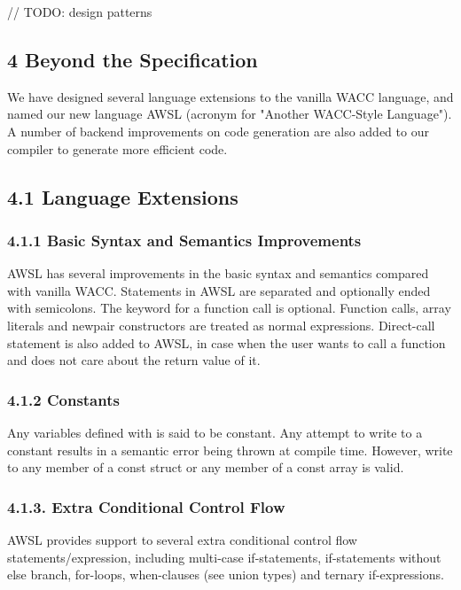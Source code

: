 \documentclass[10pt,a4paper]{report}
\begin{document}
  // TODO: design patterns

  \subsection*{4 Beyond the Specification}
  We have designed several language extensions to the vanilla WACC language, and named our new language AWSL (acronym for "Another WACC-Style Language").
  A number of backend improvements on code generation are also added to our compiler to generate more efficient code.
  \subsection*{4.1 Language Extensions}

  \subsubsection*{4.1.1 Basic Syntax and Semantics Improvements}
  AWSL has several improvements in the basic syntax and semantics compared with vanilla WACC. Statements in AWSL are separated and optionally
  ended with semicolons. The  keyword for a function call is optional. Function calls, array literals and newpair constructors 
  are treated as normal expressions. Direct-call statement is also added to AWSL, in case when the user wants to call a function and does not
  care about the return value of it.

  \subsubsection*{4.1.2 Constants}
  Any variables defined with  is said to be constant. Any attempt to write to a constant results in a semantic error being thrown at compile time.
  However, write to any member of a const struct or any member of a const array is valid. 

  \subsubsection*{4.1.3. Extra Conditional Control Flow}
  AWSL provides support to several extra conditional control flow statements/expression, including multi-case if-statements, if-statements
  without else branch, for-loops, when-clauses (see union types) and ternary if-expressions. 
\end{document}
